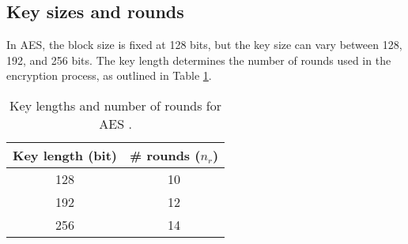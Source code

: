 \subsection{Key sizes and rounds}

In \gls{AES}, the block size is fixed at 128 bits, but the key size can vary between 128, 192, and 256 bits. 
The key length determines the number of rounds used in the encryption process, as outlined in Table \ref{table:key-length-rounds}.

\begin{table}[h]
    \centering
    \begin{tabular}{c|c}
        \textbf{Key length (bit)} & \textbf{\# rounds ($n_r$)} \\ 
        \hline
        128 & 10 \\  
        192 & 12 \\  
        256 & 14 \\  
    \end{tabular}
    \caption{Key lengths and number of rounds for AES \cite{Paar2024}.}
    \label{table:key-length-rounds}
\end{table}
